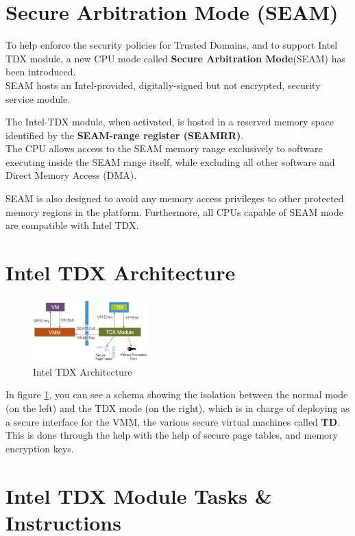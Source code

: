\section{Secure Arbitration Mode (SEAM)}

To help enforce the security policies for Trusted Domains, and to
support Intel TDX module, a new CPU mode called \textbf{Secure
Arbitration Mode}(SEAM) has been introduced.\\ 
SEAM hosts an Intel-provided, digitally-signed but not encrypted,
security service module. \smallskip

The Intel-TDX module, when activated, is hosted in a reserved memory
space identified by the \textbf{SEAM-range register (SEAMRR)}. \\ 
The CPU allows access to the SEAM memory range exclusively to software
executing inside the SEAM range itself, while excluding all other
software and Direct Memory Access (DMA). \smallskip

SEAM is also designed to avoid any memory access privileges to other
protected memory regions in the platform. Furthermore, all CPUs
capable of SEAM mode are compatible with Intel TDX.

\section{Intel TDX Architecture}

\begin{figure}[H]
  \centering
  \includegraphics[width=0.4\textwidth]{img/intel tdx arch.png}
  \caption{Intel TDX Architecture}
  \label{fig:tdx arch}
\end{figure}

In figure \ref{fig:tdx arch}, you can see a schema showing the
isolation between the normal mode (on the left) and the TDX mode (on
the right), which is in charge of deploying as a secure interface for
the VMM, the various secure virtual machines called \textbf{TD}. \\
This is done through the help with the help of secure page tables, and
memory encryption keys.

\section{Intel TDX Module Tasks \& Instructions}

